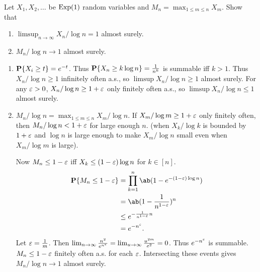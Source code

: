 \documentclass[12pt]{article}
\begin{document}
\begin{problem*}
    Let $X_1, X_2, \dots$ be \iid $\operatorname{Exp}(1)$ random variables and
    $M_n = \max_{1 \le m \le n} X_m$.
    Show that
    \begin{enumerate}
        \item $\limsup_{n \to \infty} X_n/\log n = 1$ almost surely.
        \item $M_n/\log n \to 1$ almost surely.
    \end{enumerate}
\end{problem*}
\begin{solution} \leavevmode
    \begin{enumerate}
        \item $\operatorname{\mathbf P}\{X_i \ge t\} = e^{-t}$.
        Thus $\operatorname{\mathbf P}\{X_n \ge k \log n\} = \frac1{n^k}$
        is summable iff $k > 1$.
        Thus $X_n/\log n \ge 1$ infinitely often a.s.,
        so $\limsup X_n/\log n \ge 1$ almost surely.
        For any $\varepsilon > 0$, $X_n/\log n \ge 1 + \varepsilon$ only finitely often
        a.s., so $\limsup X_n/\log n \le 1$ almost surely.
        \item $M_n/\log n = \max_{1 \le m \le n} X_m/\log n$.
        If $X_m/\log m \ge 1 + \varepsilon$ only finitely often, then
        $M_n/\log n < 1 + \varepsilon$ for large enough $n$.
        (when $X_k/\log k$ is bounded by $1 + \varepsilon$ and $\log n$ is large
        enough to make $X_m/\log n$ small even when $X_m/\log m$ is large).

        Now $M_n \le 1-\varepsilon$ iff $X_k \le (1 - \varepsilon) \log n$ for
        $k \in [n]$.
        \begin{align*}
            \P\set{M_n \le 1 - \eps}
                &= \prod_{k=1}^n \ab(1-e^{-(1-\eps)\log n}) \\
                &= \ab(1 - \frac1{n^{1-\eps}})^n \\
                &\le e^{-\frac1{n^{1-\eps}} n} \\
                &= e^{-n^\eps}.
        \end{align*}
        Let $\varepsilon = \frac1m$.
        Then $\lim_{n \to \infty} \frac{n^2}{e^{n^{\varepsilon}}}
        = \lim_{u \to \infty} \frac{u^{2m}}{e^2} = 0$.
        Thus $e^{-n^{\varepsilon}}$ is summable.
        $M_n \le 1 - \varepsilon$ finitely often a.s. for each $\varepsilon$.
        Intersecting these events gives $M_n/\log n \to 1$ almost surely.
        \qedhere
    \end{enumerate}
\end{solution}
\end{document}

